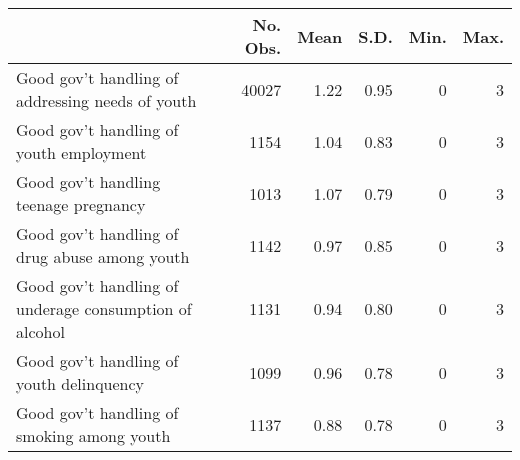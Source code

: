 \begingroup\fontsize{15}{17}\selectfont

\begin{tabular}{l|r|r|r|r|r}
\hline
  & No. Obs. & Mean & S.D. & Min. & Max.\\
\hline
Good gov't handling of addressing needs of youth & 40027 & 1.22 & 0.95 & 0 & 3\\
\hline
Good gov't handling of youth employment & 1154 & 1.04 & 0.83 & 0 & 3\\
\hline
Good gov't handling teenage pregnancy & 1013 & 1.07 & 0.79 & 0 & 3\\
\hline
Good gov't handling of drug abuse among youth & 1142 & 0.97 & 0.85 & 0 & 3\\
\hline
Good gov't handling of underage consumption of alcohol & 1131 & 0.94 & 0.80 & 0 & 3\\
\hline
Good gov't handling of youth delinquency & 1099 & 0.96 & 0.78 & 0 & 3\\
\hline
Good gov't handling of smoking among youth & 1137 & 0.88 & 0.78 & 0 & 3\\
\hline
\end{tabular}
\endgroup{}
